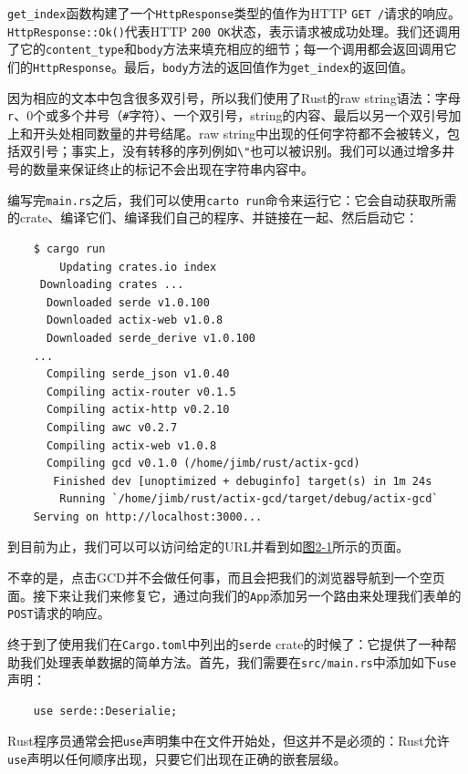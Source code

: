 \texttt{get\_index}函数构建了一个\texttt{HttpResponse}类型的值作为HTTP \texttt{GET /}请求的响应。\texttt{HttpResponse::Ok()}代表HTTP \texttt{200 OK}状态，表示请求被成功处理。我们还调用了它的\texttt{content\_type}和\texttt{body}方法来填充相应的细节；每一个调用都会返回调用它们的\texttt{HttpResponse}。最后，\texttt{body}方法的返回值作为\texttt{get\_index}的返回值。

因为相应的文本中包含很多双引号，所以我们使用了Rust的raw string语法：字母\texttt{r}、0个或多个井号（\texttt{\#}字符）、一个双引号，string的内容、最后以另一个双引号加上和开头处相同数量的井号结尾。raw string中出现的任何字符都不会被转义，包括双引号；事实上，没有转移的序列例如\texttt{\textbackslash"}也可以被识别。我们可以通过增多井号的数量来保证终止的标记不会出现在字符串内容中。

编写完\texttt{main.rs}之后，我们可以使用\texttt{carto run}命令来运行它：它会自动获取所需的crate、编译它们、编译我们自己的程序、并链接在一起、然后启动它：
\begin{verbatim}
    $ cargo run
        Updating crates.io index
     Downloading crates ...
      Downloaded serde v1.0.100
      Downloaded actix-web v1.0.8
      Downloaded serde_derive v1.0.100
    ...
      Compiling serde_json v1.0.40
      Compiling actix-router v0.1.5
      Compiling actix-http v0.2.10
      Compiling awc v0.2.7
      Compiling actix-web v1.0.8
      Compiling gcd v0.1.0 (/home/jimb/rust/actix-gcd)
       Finished dev [unoptimized + debuginfo] target(s) in 1m 24s
        Running `/home/jimb/rust/actix-gcd/target/debug/actix-gcd`
    Serving on http://localhost:3000...
\end{verbatim}

到目前为止，我们可以可以访问给定的URL并看到如\hyperref[f2-1]{图2-1}所示的页面。

不幸的是，点击GCD并不会做任何事，而且会把我们的浏览器导航到一个空页面。接下来让我们来修复它，通过向我们的\texttt{App}添加另一个路由来处理我们表单的\texttt{POST}请求的响应。

终于到了使用我们在\texttt{Cargo.toml}中列出的\texttt{serde} crate的时候了：它提供了一种帮助我们处理表单数据的简单方法。首先，我们需要在\texttt{src/main.rs}中添加如下\texttt{use}声明：
\begin{verbatim}
    use serde::Deserialie;
\end{verbatim}

Rust程序员通常会把\texttt{use}声明集中在文件开始处，但这并不是必须的：Rust允许\texttt{use}声明以任何顺序出现，只要它们出现在正确的嵌套层级。

